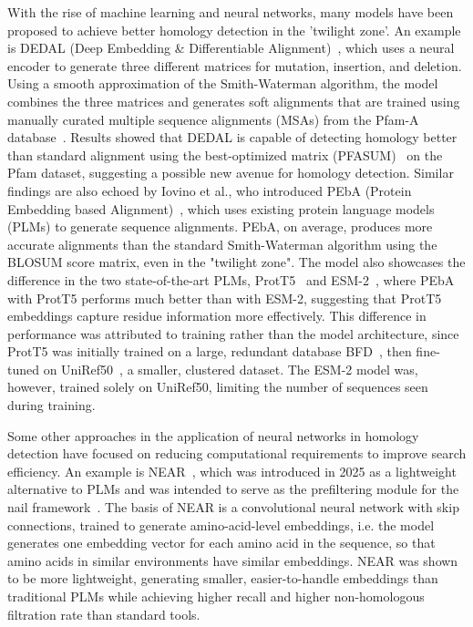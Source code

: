 \documentclass[twoside,a4paper]{master}
\begin{document}
With the rise of machine learning and neural networks, many models have been proposed to achieve better homology detection in the 'twilight zone'. An example is DEDAL (Deep Embedding \& Differentiable Alignment)~\cite{Llinares-Lopez2021.11.15.468653}, which uses a neural encoder to generate three different matrices for mutation, insertion, and deletion. Using a smooth approximation of the Smith-Waterman algorithm, the model combines the three matrices and generates soft alignments that are trained using manually curated multiple sequence alignments (MSAs) from the Pfam-A database~\cite{10.1093/nar/gkaa913}. Results showed that DEDAL is capable of detecting homology better than standard alignment using the best-optimized matrix (PFASUM)~\cite{pfasum} on the Pfam dataset, suggesting a possible new avenue for homology detection. Similar findings are also echoed by Iovino et al., who introduced PEbA (Protein Embedding based Alignment)~\cite{embedding_based_alignment}, which uses existing protein language models (PLMs) to generate sequence alignments. PEbA, on average, produces more accurate alignments than the standard Smith-Waterman algorithm using the BLOSUM score matrix, even in the "twilight zone". The model also showcases the difference in the two state-of-the-art PLMs, ProtT5~\cite{elnaggar2022prottrans} and ESM-2~\cite{doi:10.1126/science.ade2574}, where PEbA with ProtT5 performs much better than with ESM-2, suggesting that ProtT5 embeddings capture residue information more effectively. This difference in performance was attributed to training rather than the model architecture, since ProtT5 was initially trained on a large, redundant database BFD~\cite{Jumper2021}, then fine-tuned on UniRef50~\cite{10.1093/bioinformatics/btm098}, a smaller, clustered dataset. The ESM-2 model was, however, trained solely on UniRef50, limiting the number of sequences seen during training.

Some other approaches in the application of neural networks in homology detection have focused on reducing computational requirements to improve search efficiency. An example is NEAR~\cite{10.1093/bioinformatics/btaf198}, which was introduced in 2025 as a lightweight alternative to PLMs and was intended to serve as the prefiltering module for the nail framework~\cite{Roddy2024.01.27.577580}. The basis of NEAR is a convolutional neural network with skip connections, trained to generate amino-acid-level embeddings, i.e. the model generates one embedding vector for each amino acid in the sequence, so that amino acids in similar environments have similar embeddings. NEAR was shown to be more lightweight, generating smaller, easier-to-handle embeddings than traditional PLMs while achieving higher recall and higher non-homologous filtration rate than standard tools.
\end{document}
